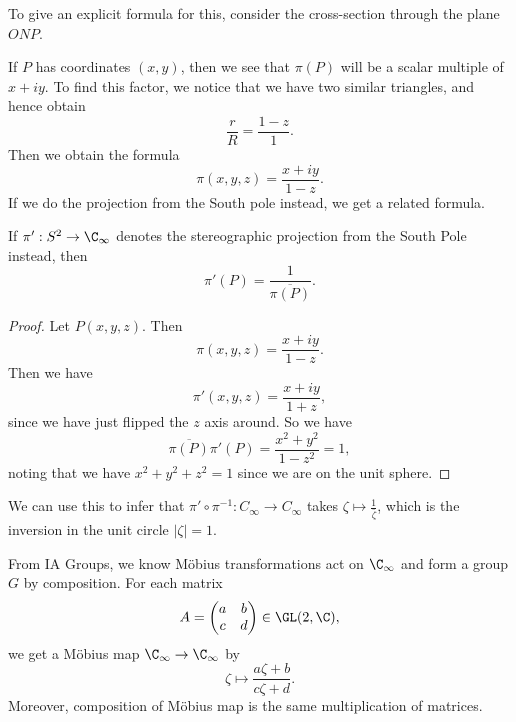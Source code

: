 \documentclass[a4paper]{article}
\begin{document}
To give an explicit formula for this, consider the cross-section through the plane $ONP$.
\begin{center}
\end{center}
If $P$ has coordinates $(x, y)$, then we see that $\pi(P)$ will be a scalar multiple of $x + iy$. To find this factor, we notice that we have two similar triangles, and hence obtain
\[
  \frac{r}{R} = \frac{1 - z}{1}.
\]
Then we obtain the formula
\[
  \pi(x, y, z) = \frac{x + iy}{1 - z}.
\]
If we do the projection from the South pole instead, we get a related formula.
\begin{lemma}
  If $\pi': S^2 \to \C_{\infty}$ denotes the stereographic projection from the South Pole instead, then
  \[
    \pi'(P) = \frac{1}{\overline{\pi(P)}}.
  \]
\end{lemma}

\begin{proof}
  Let $P(x, y, z)$. Then
  \[
    \pi(x, y, z) = \frac{x + iy}{1 - z}.
  \]
  Then we have
  \[
    \pi'(x, y, z) = \frac{x + iy}{1 + z},
  \]
  since we have just flipped the $z$ axis around. So we have
  \[
    \overline{\pi(P)}\pi'(P) = \frac{x^2 + y^2}{1 - z^2} =1,
  \]
  noting that we have $x^2 + y^2 + z^2 = 1$ since we are on the unit sphere.
\end{proof}

We can use this to infer that $\pi' \circ \pi^{-1}: C_{\infty} \to C_{\infty}$ takes $\zeta \mapsto \frac{1}{\bar{\zeta}}$, which is the inversion in the unit circle $|\zeta| = 1$.

From IA Groups, we know M\"obius transformations act on $\C_{\infty}$ and form a group $G$ by composition. For each matrix
\[
  A =
  \begin{pmatrix}
    a & b\\
    c & d
  \end{pmatrix} \in \GL(2, \C),
\]
we get a M\"obius map $\C_\infty \to \C_\infty$ by
\[
  \zeta \mapsto \frac{a \zeta + b}{c \zeta + d}.
\]
Moreover, composition of M\"obius map is the same multiplication of matrices.
\end{document}
